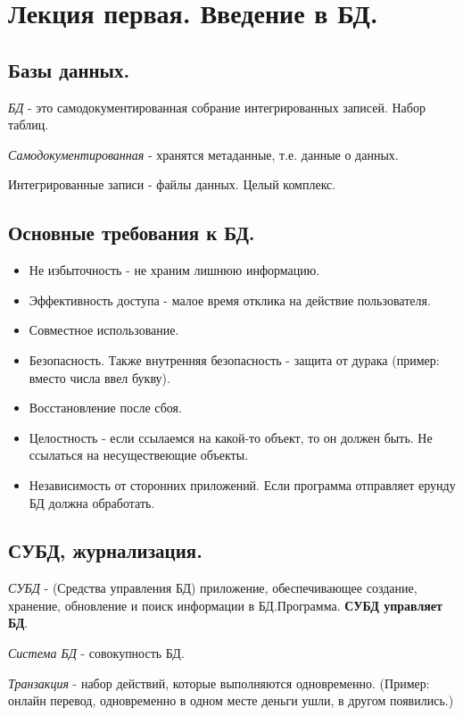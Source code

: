 \chapter{Лекция первая. Введение в БД.}

\section{Базы данных.}

\textit{БД} - это самодокументированная собрание интегрированных записей. Набор таблиц.

\textit{Самодокументированная} - хранятся метаданные, т.е. данные о данных.

Интегрированные записи - файлы данных. Целый комплекс.

\section{Основные требования к БД.}
\begin{itemize}
	\item Не избыточность - не храним лишнюю информацию.
	\item Эффективность доступа - малое время отклика на действие пользователя.
	\item Совместное использование.
	\item Безопасность. Также внутренняя безопасность - защита от дурака (пример: вместо числа ввел букву).
	\item Восстановление после сбоя.
	\item Целостность - если ссылаемся на какой-то объект, то он должен быть. Не ссылаться на несуществеющие объекты.
	\item Независимость от сторонних приложений. Если программа отправляет ерунду БД должна обработать.
\end{itemize}

\section{СУБД, журнализация.}

\textit{СУБД} - (Средства управления БД) приложение, обеспечивающее создание, хранение, обновление
и поиск информации в БД.Программа.
\textbf{СУБД управляет БД}.

\textit{Система БД} - совокупность БД.

\textit{Транзакция} - набор действий, которые выполняются одновременно.
(Пример: онлайн перевод, одновременно в одном месте деньги ушли, в другом появились.)

